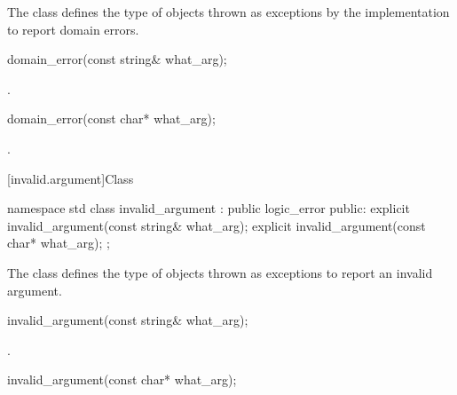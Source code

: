 \pnum
The class
defines the type of objects thrown as
exceptions by the implementation to report domain errors.

%
\begin{itemdecl}
domain_error(const string& what_arg);
\end{itemdecl}

\begin{itemdescr}
\pnum
{}

\pnum
\ensures
{}.
\end{itemdescr}

%
\begin{itemdecl}
domain_error(const char* what_arg);
\end{itemdecl}

\begin{itemdescr}
\pnum
{}

\pnum
\ensures
{}.
\end{itemdescr}

[invalid.argument]{Class }

%
\begin{codeblock}
namespace std {
  class invalid_argument : public logic_error {
  public:
    explicit invalid_argument(const string& what_arg);
    explicit invalid_argument(const char* what_arg);
  };
}
\end{codeblock}

\pnum
The class
defines the type of objects thrown as exceptions to report an invalid argument.

%
\begin{itemdecl}
invalid_argument(const string& what_arg);
\end{itemdecl}

\begin{itemdescr}
\pnum
{}

\pnum
\ensures
{}.
\end{itemdescr}

%
\begin{itemdecl}
invalid_argument(const char* what_arg);
\end{itemdecl}

